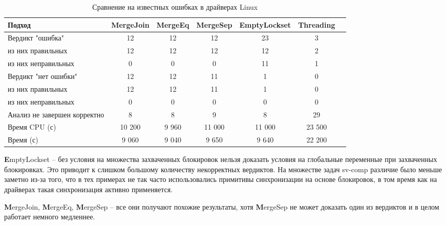 \begin{center}
  \begin{table}[h]\footnotesize
    \label{table-linux}
    \caption{Сравнение на известных ошибках в драйверах Linux}
    \begin{tabular}{ | l | c | c | c | c | c | c |}
      \hline
       Подход       & MergeJoin   & MergeEq & MergeSep & EmptyLockset & Threading \\ \hline
      Вердикт "ошибка" & 12      & 12          & 12        & 23         & 3 \\ 
  \hspace{0.5cm} из них правильных   & 12 & 12   & 12        & 12         & 2  \\ 
  \hspace{0.5cm} из них неправильных & 0 & 0   & 0        & 11         & 1 \\ \hline
      Вердикт "нет ошибки"  & 12      & 12          & 11        & 1         & 0  \\ 
  \hspace{0.5cm} из них правильных   & 12 & 12    & 11        & 1         & 0  \\ 
  \hspace{0.5cm} из них неправильных & 0 & 0    & 0        & 0         & 0 \\ \hline
      Анализ не завершен корректно       & 8      & 8          & 9        & 8         & 29 \\ \hline
      Время CPU (с)   & 10 200 & 9 960      & 11 000   & 11 000    & 23 500  \\
      Время (с)  & 9 060  & 9 040      & 9 650    & 9 640     & 22 200  \\
      \hline
    \end{tabular}
  \end{table}
\end{center}

{\textbf EmptyLockset} -- без условия на множества захваченных блокировок нельзя доказать условия на глобальные переменные при захваченных блокировках. Это приводит к слишком большому количеству некорректных вердиктов.
На множестве задач sv-comp различие было меньше заметно из-за того, что в тех примерах не так часто использовались примитивы синхронизации на основе блокировок, в том время как на драйверах такая синхронизация активно применяется.

{\textbf MergeJoin}, {\textbf MergeEq}, {\textbf MergeSep} -- все они получают похожие результаты, хотя {\textbf MergeSep} не может доказать один из вердиктов и в целом работает немного медленнее.


